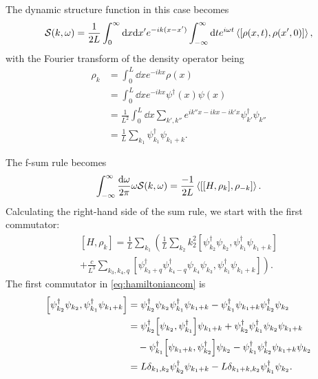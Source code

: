 \documentclass[11pt, a4paper]{report} %
\begin{document}
The dynamic structure function in this case becomes
\begin{equation}
  \label{eq:3}
  \mathcal{S}(k,\omega) = \frac{1}{2L} \int_0^{\infty} \dd x \dd x' e^{-ik(x-x')} \int_{-\infty}^{\infty} \dd t e^{i\omega t} \expval{\left[\rho(x, t), \rho(x',0)\right]},
\end{equation}
with the Fourier transform of the density operator being 
\begin{align}
  \label{eq:4}
  \rho_k &= \int_{0}^{L} \dd x e^{-ikx} \rho(x) \\
         &= \int_{0}^{L} \dd x e^{-ikx} \psi^{\dag}(x) \psi(x)\\
         &= \frac{1}{L^2} \int_{0}^{L} \dd x \sum_{k',k''} e^{ik''x-ikx-ik'x} \psi_{k'}^{\dag} \psi_{k''}\\
         &= \frac{1}{L} \sum_{k_1} \psi_{k_1}^{\dag} \psi_{k_1+k}.
\end{align}

The f-sum rule becomes
\begin{equation}
  \label{eq:5}
  \int_{-\infty}^{\infty} \frac{\dd \omega}{2\pi} \omega\mathcal{S} (k, \omega) = \frac{-1}{2L} \expval{[[H,\rho_k],\rho_{-k}]}.
\end{equation}
Calculating the right-hand side of the sum rule, we start with the first commutator:
\begin{multline}
  \label{eq:hamiltoniancom}
  [H, \rho_k] = \frac{1}{L} \sum_{k_1} \left(\frac{1}{L} \sum_{k_2}k_2^2\left[\psi_{k_2}^{\dag}\psi_{k_2}, \psi_{k_1}^{\dag}\psi_{k_1+k}\right] \right.\\\left.+\frac{c}{L^3} \sum_{k_3, k_4, q} \left[\psi_{k_3+q}^{\dag}\psi_{k_4-q}^{\dag}\psi_{k_4}\psi_{k_3},\psi_{k_1}^{\dag}\psi_{k_1+k}\right]  \right).
\end{multline}
The first commutator in \cref{eq:hamiltoniancom} is 
\begin{align}
  \label{eq:7}
  \left[\psi_{k_2}^{\dag}\psi_{k_2}, \psi_{k_1}^{\dag}\psi_{k_1+k}\right] &= \psi_{k_2}^{\dag}\psi_{k_2} \psi_{k_1}^{\dag}\psi_{k_1+k} - \psi_{k_1}^{\dag}\psi_{k_1+k}\psi_{k_2}^{\dag}\psi_{k_2}\\
                                                                          &= \psi_{k_2}^{\dag}\qty[\psi_{k_2}, \psi_{k_1}^{\dag}]\psi_{k_1+k} +  \psi_{k_2}^{\dag}\psi_{k_1}^{\dag}\psi_{k_2}\psi_{k_1+k}\nonumber\\
                                                                          &\quad- \psi_{k_1}^{\dag}\qty[\psi_{k_1+k},\psi_{k_2}^{\dag}]\psi_{k_2} - \psi_{k_1}^{\dag}\psi_{k_2}^{\dag}\psi_{k_1+k}\psi_{k_2}\\
                                                                          &= L \delta_{k_1,k_2} \psi_{k_2}^{\dag}\psi_{k_1+k} - L \delta_{k_1+k,k_2}\psi_{k_1}^{\dag}\psi_{k_2} .
\end{align}
\end{document}
